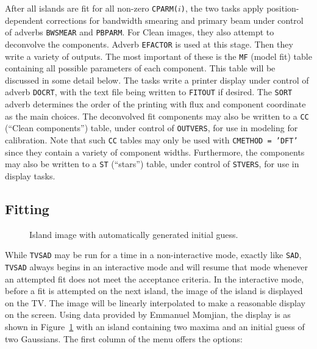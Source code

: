 \documentclass[twoside]{article}
\newcommand{\putfig}[1]{\texttt{[image: \#1.eps]}}
\begin{document}
After all islands are fit for all non-zero {\tt CPARM($i$)}, the two
tasks apply position-dependent corrections for bandwidth smearing and
primary beam under control of adverbs {\tt BWSMEAR} and {\tt PBPARM}.
For Clean images, they also attempt to deconvolve the components.
Adverb {\tt EFACTOR} is used at this stage.  Then they write a variety
of outputs.  The most important of these is the {\tt MF} (model fit)
table containing all possible parameters of each component.  This
table will be discussed in some detail below.  The tasks write a
printer display under control of adverb {\tt DOCRT}, with the text
file being written to {\tt FITOUT} if desired.  The {\tt SORT} adverb
determines the order of the printing with flux and component
coordinate as the main choices.  The deconvolved fit components may
also be written to a {\tt CC} (``Clean components'') table, under
control of {\tt OUTVERS}, for use in modeling for calibration.  Note
that such {\tt CC} tables may only be used with {\tt CMETHOD = 'DFT'}
since they contain a variety of component widths.  Furthermore, the
components may also be written to a {\tt ST} (``stars'') table, under
control of {\tt STVERS}, for use in display tasks.

\subsection{Fitting}

\begin{figure}
\begin{center}
\resizebox{6.0in}{!}{\putfig{TVSAD.1}}
\caption{Island image with automatically generated initial guess.}
\label{fig:TVSAD.init}
\end{center}
\end{figure}

While {\tt TVSAD} may be run for a time in a non-interactive mode,
exactly like {\tt SAD}, {\tt TVSAD} always begins in an interactive
mode and will resume that mode whenever an attempted fit does not meet
the acceptance criteria.  In the interactive mode, before a fit is
attempted on the next island, the image of the island is displayed on
the TV\@.  The image will be linearly interpolated to make a
reasonable display on the screen.  Using data provided by Emmanuel
Momjian, the display is as shown in Figure~\ref{fig:TVSAD.init} with
an island containing two maxima and an initial guess of two Gaussians.
The first column of the menu offers the options:
\end{document}
